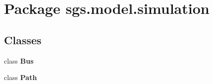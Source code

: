 \section{Package sgs.\-model.\-simulation}
\label{namespacesgs_1_1model_1_1simulation}
\subsection*{Classes}
\begin{DoxyCompactItemize}
\item 
class {\bf Bus}
\item 
class {\bf Path}
\end{DoxyCompactItemize}
